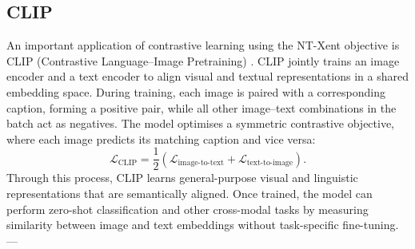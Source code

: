 \subsection{CLIP}
An important application of contrastive learning using the NT-Xent objective is CLIP (Contrastive Language--Image Pretraining) \cite{}. CLIP jointly trains an image encoder and a text encoder to align visual and textual representations in a shared embedding space.  
During training, each image is paired with a corresponding caption, forming a positive pair, while all other image--text combinations in the batch act as negatives. The model optimises a symmetric contrastive objective, where each image predicts its matching caption and vice versa:
\[
\mathcal{L}_{\text{CLIP}} = \frac{1}{2}(\mathcal{L}_{\text{image-to-text}} + \mathcal{L}_{\text{text-to-image}}).
\]
Through this process, CLIP learns general-purpose visual and linguistic representations that are semantically aligned. Once trained, the model can perform zero-shot classification and other cross-modal tasks by measuring similarity between image and text embeddings without task-specific fine-tuning.
---